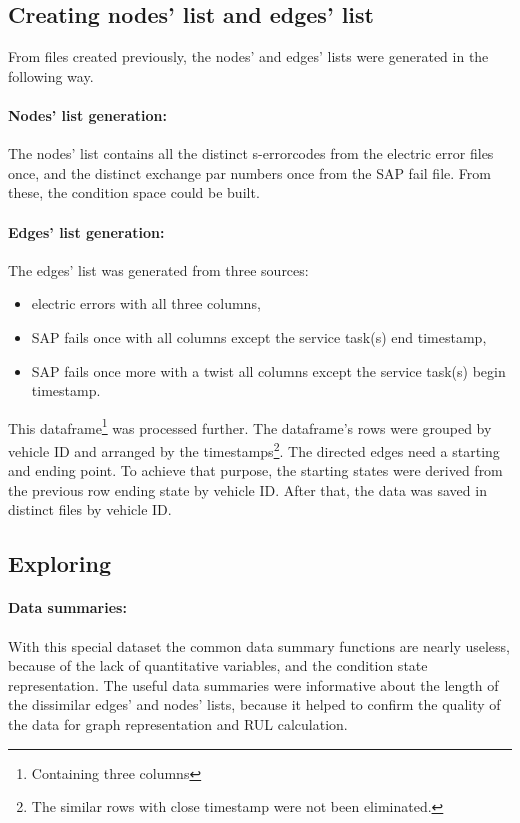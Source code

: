 	\subsection{Creating nodes' list and edges' list}
From files created previously, the nodes' and edges' lists were generated in the following way.
\paragraph{Nodes' list generation:}
The nodes' list contains all the distinct s-errorcodes from the electric error files once, and the distinct exchange par numbers once from the SAP fail file. From these, the condition space could be built.
\paragraph{Edges' list generation:}
The edges' list was generated from three sources: 
\begin{itemize}
	\item{electric errors} with all three columns,
	\item{SAP fails once} with all columns except the service task(s) end timestamp,
	\item{SAP fails once more with a twist} all columns except the service task(s) begin timestamp.
\end{itemize}

This dataframe\footnote{Containing three columns} was processed further. The dataframe's rows were grouped by vehicle ID and arranged by the timestamps\footnote{The similar rows with close timestamp were not been eliminated.}.
The directed edges need a starting and ending point. To achieve that purpose, the starting states were derived from the previous row ending state by vehicle ID. After that, the data was saved in distinct files by vehicle ID.
	\subsection{Exploring}
		\paragraph{Data summaries:}
		With this special dataset the common data summary functions are nearly useless, because of the lack of quantitative variables, and the condition state representation.
		The useful data summaries were informative about the length of the dissimilar edges' and nodes' lists, because it helped to confirm the quality of the data for graph representation and RUL calculation. 


